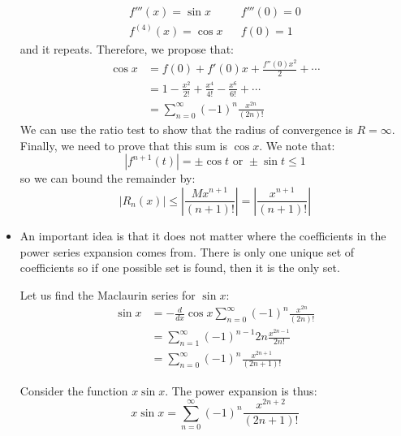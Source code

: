 \begin{itemize}
\begin{example}
\begin{align}
            f'''(x) = \sin x && f'''(0)= 0 \\ 
            f^{(4)}(x) = \cos x && f(0) = 1
        \end{align}
        and it repeats. Therefore, we propose that:
        \begin{align}
            \cos x &= f(0)+f'(0)x+\frac{f''(0)x^2}{2}+\cdots \\ 
            &= 1-\frac{x^2}{2!}+\frac{x^4}{4!}-\frac{x^6}{6!}+\cdots \\ 
            &= \sum_{n=0}^\infty (-1)^n \frac{x^{2n}}{(2n)!}
        \end{align}
        We can use the ratio test to show that the radius of convergence is $R=\infty$. Finally, we need to prove that this sum is $\cos x$. We note that:
        \begin{equation}
            |f^{n+1}(t)| = \pm \cos t \text{ or } \pm \sin t \le 1
        \end{equation}
        so we can bound the remainder by:
        \begin{equation}
            |R_n(x)| \le \left|\frac{Mx^{n+1}}{(n+1)!}\right| = \left|\frac{x^{n+1}}{(n+1)!}\right|
        \end{equation}
    \end{example}
    \item An important idea is that it does not matter where the coefficients in the power series expansion comes from. There is only one unique set of coefficients so if one possible set is found, then it is the only set.
    \begin{example}
        Let us find the Maclaurin series for $\sin x$:
        \begin{align}
            \sin x &= -\frac{d}{dx}\cos x \sum_{n=0}^\infty (-1)^n \frac{x^{2n}}{(2n)!} \\ 
            &= \sum_{n=1}^\infty (-1)^{n-1} 2n\frac{x^{2n-1}}{2n!} \\ 
            &= \sum_{n=0}^\infty (-1)^n \frac{x^{2n+1}}{(2n+1)!}
        \end{align}
    \end{example}
    \begin{example}
        Consider the function $x\sin x$. The power expansion is thus:
        \begin{equation}
            x\sin x = \sum_{n=0}^\infty (-1)^n \frac{x^{2n+2}}{(2n+1)!}
        \end{equation}
    \end{example}
    \begin{example}

\end{example}
\end{itemize}
